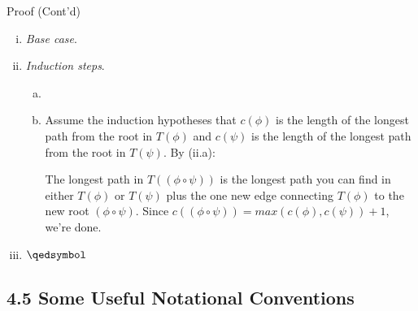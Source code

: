 \begin{frame}{Proof (Cont'd)}

\begin{enumerate}[(i)]
		
			\item \emph{Base case}. \checkmark
			
			\item \emph{Induction steps}. 
				\begin{enumerate}[(a)]

					\item \checkmark
					
					\item Assume the induction hypotheses that $c(\phi)$ is the length of the longest path from the root in $T(\phi)$ and $c(\psi)$ is the length of the longest path from the root in $T(\psi)$. By (ii.a):
					\begin{center}
\end{center}
The longest path in $T((\phi\circ\psi))$ is the longest path you can find in either $T(\phi)$ or $T(\psi)$ plus the one new edge connecting $T(\phi)$ to the new root $(\phi\circ\psi)$. Since $c((\phi\circ\psi))=max(c(\phi),c(\psi))+1$, we're done. 

		
		\end{enumerate}
		
		\item[] $\qedsymbol$
		
		\end{enumerate}
	
\end{frame}

\subsection{4.5 Some Useful Notational Conventions}


